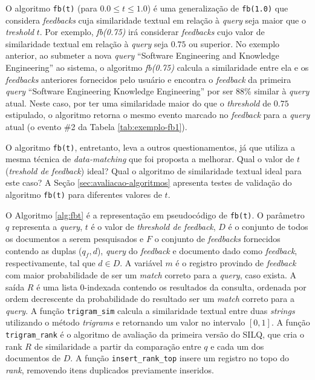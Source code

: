 \documentclass[12pt]{article}
\newcommand{\quotes}[1]{``#1''}
\begin{document}
O algoritmo \texttt{fb(t)} (para $0.0 \le t \le 1.0$) é uma generalização de \texttt{fb(1.0)} que considera \textit{feedbacks} cuja similaridade textual em relação à \textit{query} seja maior que o \textit{treshold} $t$. Por exemplo, \textit{fb(0.75)} irá considerar \textit{feedbacks} cujo valor de similaridade textual em relação à \textit{query} seja $0.75$ ou superior. No exemplo anterior, ao submeter a nova \textit{query} \quotes{Software Engineering and Knowledge Engineering} ao sistema, o algoritmo \textit{fb(0.75)} calcula a similaridade entre ela e os \textit{feedbacks} anteriores fornecidos pelo usuário e encontra o \textit{feedback} da primeira \textit{query} \quotes{Software Engineering Knowledge Engineering} por ser 88\% similar à \textit{query} atual. Neste caso, por ter uma similaridade maior do que o \textit{threshold} de $0.75$ estipulado, o algoritmo retorna o mesmo evento marcado no \textit{feedback} para a \textit{query} atual (o evento \#2 da Tabela \ref{tab:exemplo-fb1}).

O algoritmo \texttt{fb(t)}, entretanto, leva a outros questionamentos, já que utiliza a mesma técnica de \textit{data-matching} que foi proposta a melhorar. Qual o valor de $t$ (\textit{treshold de feedback}) ideal? Qual o algoritmo de similaridade textual ideal para este caso? A Seção \ref{sec:avaliacao-algoritmos} apresenta testes de validação do algoritmo \texttt{fb(t)} para diferentes valores de $t$.

O Algoritmo \ref{alg:fbt} é a representação em pseudocódigo de \texttt{fb(t)}. O parâmetro $q$ representa a \textit{query}, $t$ é o valor de \textit{threshold de feedback}, $D$ é o conjunto de todos os documentos a serem pesquisados e $F$ o conjunto de \textit{feedbacks} fornecidos contendo as duplas ($q_f, d$), \textit{query} do \textit{feedback} e documento dado como \textit{feedback}, respectivamente, tal que $d \in D$. A variável $m$ é o registro provindo de \textit{feedback} com maior probabilidade de ser um \textit{match} correto para a \textit{query}, caso exista. A saída $R$ é uma lista 0-indexada contendo os resultados da consulta, ordenada por ordem decrescente da probabilidade do resultado ser um \textit{match} correto para a \textit{query}. A função \texttt{trigram\_sim} calcula a similaridade textual entre duas \textit{strings} utilizando o método \textit{trigrams} e retornando um valor no intervalo $[0, 1]$. A função \texttt{trigram\_rank} é o algoritmo de avaliação da primeira versão do SILQ, que cria o rank $R$ de similaridade a partir da comparação entre $q$ e cada um dos documentos de $D$. A função \texttt{insert\_rank\_top} insere um registro no topo do \textit{rank}, removendo itens duplicados previamente inseridos.
\end{document}
